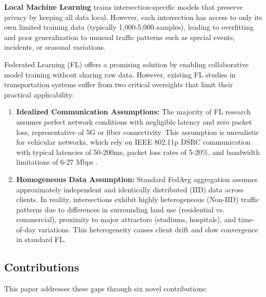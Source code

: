 \documentclass[conference]{IEEEtran}
\begin{document}
\textbf{Local Machine Learning} trains intersection-specific models that preserve privacy by keeping all data local. However, each intersection has access to only its own limited training data (typically 1,000-5,000 samples), leading to overfitting and poor generalization to unusual traffic patterns such as special events, incidents, or seasonal variations.

Federated Learning (FL) offers a promising solution by enabling collaborative model training without sharing raw data. However, existing FL studies in transportation systems suffer from two critical oversights that limit their practical applicability:

\begin{enumerate}
    \item \textbf{Idealized Communication Assumptions:} The majority of FL research assumes perfect network conditions with negligible latency and zero packet loss, representative of 5G or fiber connectivity. This assumption is unrealistic for vehicular networks, which rely on IEEE 802.11p DSRC communication with typical latencies of 50-200ms, packet loss rates of 5-20\%, and bandwidth limitations of 6-27 Mbps \cite{kenney2011dsrc}.

    \item \textbf{Homogeneous Data Assumption:} Standard FedAvg aggregation \cite{mcmahan2017fedavg} assumes approximately independent and identically distributed (IID) data across clients. In reality, intersections exhibit highly heterogeneous (Non-IID) traffic patterns due to differences in surrounding land use (residential vs. commercial), proximity to major attractors (stadiums, hospitals), and time-of-day variations. This heterogeneity causes client drift and slow convergence in standard FL.
\end{enumerate}

\subsection{Contributions}
This paper addresses these gaps through six novel contributions:
\end{document}
